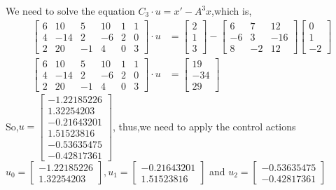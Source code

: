 \documentclass[a4paper,11pt,reqno]{amsart}
\begin{document}
We need to solve the equation $C_3\cdot u=x'-A^3x$,which is,
$$
\begin{aligned}
    \begin{bmatrix} 6 & 10 & 5 & 10 & 1 & 1 \\ 4 & -14 & 2 & -6 & 2 & 0 \\ 2 & 20 & -1 & 4 & 0 & 3 \end{bmatrix}
    \cdot u&=\begin{bmatrix} 2 \\ 1 \\ 3 \end{bmatrix}-\begin{bmatrix} 6 & 7 & 12 \\ -6 & 3 & -16 \\ 8 & -2 & 12 \end{bmatrix}
    \begin{bmatrix} 0 \\ 1 \\ -2 \end{bmatrix}
    \\
    \begin{bmatrix} 6 & 10 & 5 & 10 & 1 & 1 \\ 4 & -14 & 2 & -6 & 2 & 0 \\ 2 & 20 & -1 & 4 & 0 & 3 \end{bmatrix}
    \cdot u&=\begin{bmatrix} 19 \\ -34 \\ 29 \end{bmatrix}
\end{aligned}
$$
So,$u=\begin{bmatrix} -1.22185226 \\ 1.32254203 \\ -0.21643201 \\1.51523816\\-0.53635475\\-0.42817361 \end{bmatrix}$,
thus,we need to apply the control actions $u_0=\begin{bmatrix} -1.22185226 \\ 1.32254203 \end{bmatrix},
u_1=\begin{bmatrix} -0.21643201 \\1.51523816 \end{bmatrix}$ and $u_2=\begin{bmatrix} -0.53635475\\-0.42817361 \end{bmatrix}$
\end{document}

